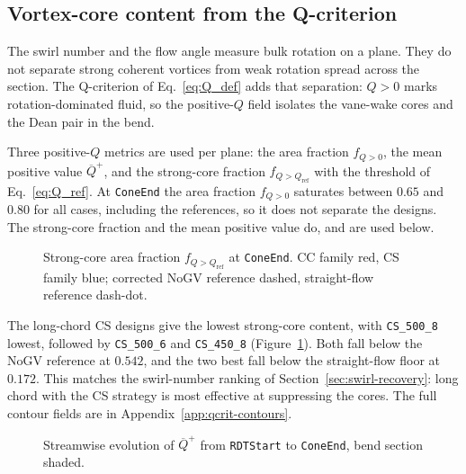 \subsection{Vortex-core content from the Q-criterion}
\label{sec:q-criterion-analysis}

The swirl number and the flow angle measure bulk rotation on a plane. They do not separate strong coherent vortices from weak rotation spread across the section. The Q-criterion of Eq.~\eqref{eq:Q_def} adds that separation: \(Q>0\) marks rotation-dominated fluid, so the positive-\(Q\) field isolates the vane-wake cores and the Dean pair in the bend.

Three positive-\(Q\) metrics are used per plane: the area fraction \(f_{Q>0}\), the mean positive value \(\overline{Q}^{+}\), and the strong-core fraction \(f_{Q>Q_{\mathrm{ref}}}\) with the threshold of Eq.~\eqref{eq:Q_ref}. At \texttt{ConeEnd} the area fraction \(f_{Q>0}\) saturates between \(0.65\) and \(0.80\) for all cases, including the references, so it does not separate the designs. The strong-core fraction and the mean positive value do, and are used below.

\begin{figure}[h!]
\centering
{}
\caption[Strong-core fraction at \texttt{ConeEnd}]{Strong-core area fraction $f_{Q>Q_{\mathrm{ref}}}$ at \texttt{ConeEnd}. CC family red, CS family blue; corrected NoGV reference dashed, straight-flow reference dash-dot.}
\label{fig:qcrit-fstrong-coneend}
\end{figure}

The long-chord CS designs give the lowest strong-core content, with \texttt{CS\_500\_8} lowest, followed by \texttt{CS\_500\_6} and \texttt{CS\_450\_8} (Figure~\ref{fig:qcrit-fstrong-coneend}). Both fall below the NoGV reference at \(0.542\), and the two best fall below the straight-flow floor at \(0.172\). This matches the swirl-number ranking of Section~\ref{sec:swirl-recovery}: long chord with the CS strategy is most effective at suppressing the cores. The full contour fields are in Appendix~\ref{app:qcrit-contours}.

\begin{figure}[h!]
\centering
{}
\caption[Streamwise evolution of $\overline{Q}^{+}$]{Streamwise evolution of $\overline{Q}^{+}$ from \texttt{RDTStart} to \texttt{ConeEnd}, bend section shaded.}
\label{fig:qcrit-streamwise}
\end{figure}

